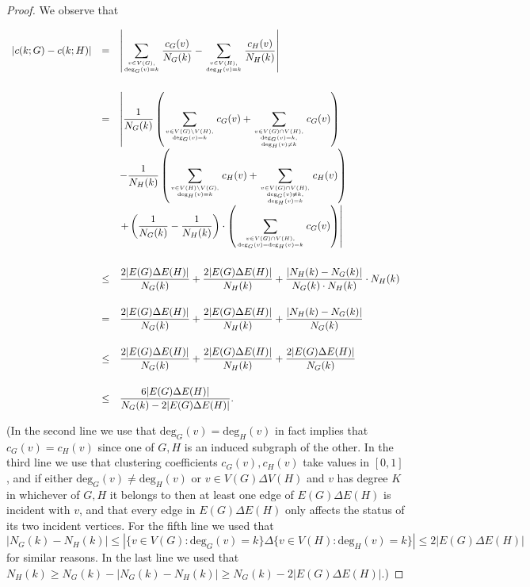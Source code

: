 \begin{proof} 
We observe that
 
$$ \begin{array}{rcl} 
|c(k; G)-c(k;H)| 
& = & \displaystyle
\left| \sum_{v\in V(G), \atop\text{deg}_G(v)=k} \frac{c_G(v)}{N_G(k)} - 
\sum_{v\in V(H), \atop\text{deg}_{H}(v)=k} \frac{c_{H}(v)}{N_{H}(k)} \right| \\[8ex]
& = & \displaystyle 
\left| \frac{1}{N_G(k)} \left( \sum_{v\in V(G)\setminus V(H), \atop\text{deg}_G(v)=k} c_G(v)
+ \sum_{v\in V(G)\cap V(H), \atop{\text{deg}_G(v)=k, \atop\text{deg}_{H}(v)\neq k}} c_G(v) \right) \right. \\
& & \displaystyle
- \frac{1}{N_{H}(k)} \left(\sum_{v\in V(H)\setminus V(G), \atop\text{deg}_{H}(v)=k} c_{H}(v)
+ \sum_{v\in V(G)\cap V(H), \atop{\text{deg}_G(v)\neq k, \atop\text{deg}_{H}(v)=k}} c_{H}(v) \right) \\
& & \displaystyle  
\left. + \left(\frac{1}{N_G(k)}-\frac{1}{N_{H}(k)} \right) \cdot 
\left( \sum_{v \in V(G)\cap V(H), \atop\text{deg}_G(v)=\text{deg}_{H}(v)=k}
c_G(v) \right) \right| \\[8ex]
 & \leq & \displaystyle
 \frac{2|E(G)\Delta E(H)|}{N_G(k)} + \frac{2|E(G)\Delta E(H)|}{N_{H}(k)} + 
 \frac{|N_{H}(k) - N_G(k)|}{N_G(k)\cdot N_{H}(k)} \cdot N_{H}(k) \\[5ex]
 & = & \displaystyle 
 \frac{2|E(G)\Delta E(H)|}{N_G(k)} + \frac{2|E(G)\Delta E(H)|}{N_{H}(k)} + \frac{|N_{H}(k) - N_G(k)|}{N_G(k)} \\[5ex]
 & \leq & \displaystyle
 \frac{2|E(G)\Delta E(H)|}{N_G(k)} + \frac{2|E(G)\Delta E(H)|}{N_{H}(k)} + \frac{2|E(G)\Delta E(H)|}{N_G(k)} \\[5ex]
 & \leq & \displaystyle
\frac{6 |E(G)\Delta E(H)|}{N_G(k)-2|E(G)\Delta E(H)|}.
\end{array} $$

\noindent
(In the second line we use that $\text{deg}_G(v) = \text{deg}_{H}(v)$ in fact 
implies that $c_G(v) = c_{H}(v)$ since one of $G,H$ is an induced subgraph of the other. 
In the third line we use that clustering coefficients $c_G(v), c_H(v)$ take values in $[0,1]$, and if either 
$\text{deg}_{G}(v) \neq \text{deg}_{H}(v)$ or $v \in V(G)\Delta V(H)$ and $v$ has degree $K$ in whichever of $G, H$ it belongs to 
then at least one edge of $E(G)\Delta E(H)$ is incident with $v$, and that every edge in 
$E(G)\Delta E(H)$ only affects the status of its two incident vertices.
For the fifth line we used that $|N_G(k)-N_H(k)| \leq |\{ v\in V(G) : \text{deg}_G(v) = k \} \Delta 
\{ v\in V(H) : \text{deg}_H(v) = k \}| \leq 2|E(G)\Delta E(H)|$ for similar reasons.
In the last line we used that $N_H(k) \geq N_G(k) - |N_G(k)-N_H(k)| \geq N_G(k) - 2|E(G)\Delta E(H)|$.)
\end{proof}

